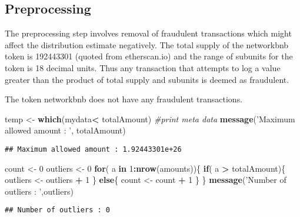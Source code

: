 \documentclass[]{article}
\newenvironment{Shaded}{\begin{snugshade}}{\end{snugshade}}
\newcommand{\KeywordTok}[1]{\textcolor[rgb]{0.13,0.29,0.53}{\textbf{#1}}}
\newcommand{\DecValTok}[1]{\textcolor[rgb]{0.00,0.00,0.81}{#1}}
\newcommand{\StringTok}[1]{\textcolor[rgb]{0.31,0.60,0.02}{#1}}
\newcommand{\CommentTok}[1]{\textcolor[rgb]{0.56,0.35,0.01}{\textit{#1}}}
\newcommand{\ControlFlowTok}[1]{\textcolor[rgb]{0.13,0.29,0.53}{\textbf{#1}}}
\newcommand{\OperatorTok}[1]{\textcolor[rgb]{0.81,0.36,0.00}{\textbf{#1}}}
\newcommand{\NormalTok}[1]{#1}
\begin{document}
\subsection{Preprocessing}\label{preprocessing}

The preprocessing step involves removal of fraudulent transactions which
might affect the distribution estimate negatively. The total supply of
the networkbnb token is 192443301 (quoted from etherscan.io) and the
range of subunits for the token is 18 decimal units. Thus any
transaction that attempts to log a value greater than the product of
total supply and subunits is deemed as fraudulent.

The token networkbnb does not have any fraudulent transactions.

\begin{Shaded}
\begin{Highlighting}[]
\NormalTok{temp <-}\StringTok{ }\KeywordTok{which}\NormalTok{(mydata}\OperatorTok{<}\StringTok{ }\NormalTok{totalAmount)}
\CommentTok{#print meta data }
\KeywordTok{message}\NormalTok{(}\StringTok{'Maximum allowed amount : '}\NormalTok{, totalAmount)}
\end{Highlighting}
\end{Shaded}

\begin{verbatim}
## Maximum allowed amount : 1.92443301e+26
\end{verbatim}

\begin{Shaded}
\begin{Highlighting}[]
\NormalTok{count <-}\StringTok{ }\DecValTok{0}
\NormalTok{outliers <-}\StringTok{ }\DecValTok{0}
\ControlFlowTok{for}\NormalTok{( a }\ControlFlowTok{in} \DecValTok{1}\OperatorTok{:}\KeywordTok{nrow}\NormalTok{(amounts))\{}
  \ControlFlowTok{if}\NormalTok{( a }\OperatorTok{>}\StringTok{ }\NormalTok{totalAmount)\{}
\NormalTok{    outliers <-}\StringTok{ }\NormalTok{outliers }\OperatorTok{+}\StringTok{ }\DecValTok{1}
\NormalTok{  \}}
  \ControlFlowTok{else}\NormalTok{\{}
\NormalTok{    count <-}\StringTok{ }\NormalTok{count }\OperatorTok{+}\StringTok{ }\DecValTok{1}
\NormalTok{  \}}
\NormalTok{\}}
\KeywordTok{message}\NormalTok{(}\StringTok{'Number of outliers : '}\NormalTok{,outliers)}
\end{Highlighting}
\end{Shaded}

\begin{verbatim}
## Number of outliers : 0
\end{verbatim}
\end{document}
